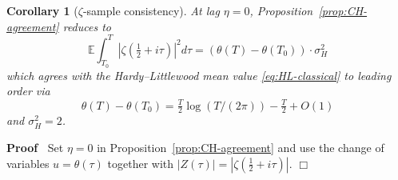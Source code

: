 \documentclass{article}
\newenvironment{proof}{\noindent\textbf{Proof\ }}{\hspace*{\fill}$\Box$\medskip}
\newtheorem{corollary}{Corollary}
\begin{document}
\begin{corollary}
  [$\zeta$-sample consistency]\label{cor:zeta-consistency}At lag $\eta = 0$,
  Proposition~\ref{prop:CH-agreement} reduces to
  \begin{equation}
    \mathbb{E} \int_{T_0}^T \left| \zeta (\tfrac{1}{2} + i \tau) \right|^2 d
    \tau = (\theta (T) - \theta (T_0)) \cdot \sigma_H^2
  \end{equation}
  which agrees with the Hardy--Littlewood mean value \eqref{eq:HL-classical}
  to leading order via
  \begin{equation}
    \theta (T) - \theta (T_0) = \tfrac{T}{2} \log (T / (2 \pi)) - \tfrac{T}{2}
    + O (1)
  \end{equation}
  and $\sigma_H^2 = 2$.
\end{corollary}

\begin{proof}
  Set $\eta = 0$ in Proposition~\ref{prop:CH-agreement} and use the change of
  variables $u = \theta (\tau)$ together with $|Z (\tau) | = | \zeta
  (\tfrac{1}{2} + i \tau) |$.
\end{proof}
\end{document}
